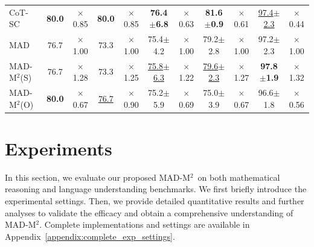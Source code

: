\documentclass{article} %
\newcommand{\methodname}{MAD-M$^2$}
\theoremstyle{plain}
\begin{document}
\begin{table}[t]
\begin{center}
\begin{small}
\begin{threeparttable}
\begin{tabular}{lcccccccccc}
                    CoT-SC & \textbf{80.0} & $\times$0.85 & \textbf{80.0} & $\times$0.85 & \textbf{76.4$\pm$6.8} & $\times$0.63 & \textbf{81.6$\pm$0.9} & $\times$0.61 & \uline{97.4$\pm$2.3}   &$\times$0.44\\
                    MAD & 76.7  &$\times$1.00 & 73.3 &$\times$1.00 & 75.4$\pm$4.2 &$\times$1.00 & 79.2$\pm$2.8 & $\times$1.00   & 97.2$\pm$2.3  &$\times$1.00\\
                    \rowcolor{gray!15}\methodname (S) & 76.7  &$\times$1.28 & 73.3 &$\times$1.25 & \uline{75.8$\pm$6.3} &$\times$1.22 & \uline{79.6$\pm$2.3} &$\times$1.27  & \textbf{97.8$\pm$1.9} &$\times$1.32\\
                    \rowcolor{gray!15}\methodname (O) & \textbf{80.0}  &$\times$0.67 & \uline{76.7} &$\times$0.90 & 75.2$\pm$5.9 &$\times$0.69 & 75.0$\pm$3.9 &$\times$0.67 & 96.6$\pm$1.8  &$\times$0.56\\
                    \bottomrule
				\end{tabular}
			\end{threeparttable}
		\end{small}
	\end{center}
	\vskip -0.25in
\end{table}

\vspace{-8pt}
\section{Experiments}
\label{sec:experiments}
\vspace{-6pt}
In this section, we evaluate our proposed \methodname\ on both mathematical reasoning and language understanding benchmarks. We first briefly introduce the experimental settings. Then, we provide detailed quantitative results and further analyses to validate the efficacy and obtain a comprehensive understanding of \methodname. Complete implementations and settings are available in Appendix~\ref{appendix:complete_exp_settings}.
\end{document}
